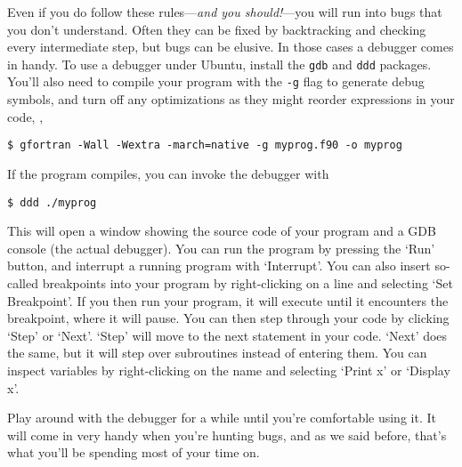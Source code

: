 Even if you do follow these rules---\emph{and you should!}---you will run into bugs that you don't understand.
Often they can be fixed by backtracking and checking every intermediate step, but bugs can be elusive.
In those cases a debugger comes in handy.
To use a debugger under Ubuntu, install the \texttt{gdb} and \texttt{ddd} packages.
You'll also need to compile your program with the \texttt{-g} flag to generate debug symbols, and turn off any optimizations as they might reorder expressions in your code, \eg,
\begin{verbatim}
$ gfortran -Wall -Wextra -march=native -g myprog.f90 -o myprog
\end{verbatim}
If the program compiles, you can invoke the debugger with
\begin{verbatim}
$ ddd ./myprog
\end{verbatim}
This will open a window showing the source code of your program and a GDB console (the actual debugger).
You can run the program by pressing the `Run' button, and interrupt a running program with `Interrupt'.
You can also insert so-called breakpoints into your program by right-clicking on a line and selecting `Set Breakpoint'.
If you then run your program, it will execute until it encounters the breakpoint, where it will pause.
You can then step through your code by clicking `Step' or `Next'.
`Step' will move to the next statement in your code.
`Next' does the same, but it will step over subroutines instead of entering them.
You can inspect variables by right-clicking on the name and selecting `Print x' or `Display x'.

Play around with the debugger for a while until you're comfortable using it.
It will come in very handy when you're hunting bugs, and as we said before, that's what you'll be spending most of your time on.
